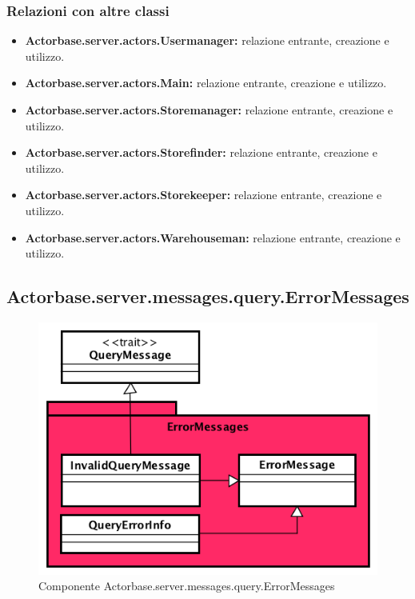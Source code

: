 \documentclass[a4paper]{article}
\begin{document}
			\subsubsection{Relazioni con altre classi}
				\begin{itemize}
					\item \textbf{Actorbase.server.actors.Usermanager:} relazione entrante, creazione e utilizzo.
					\item \textbf{Actorbase.server.actors.Main:} relazione entrante, creazione e utilizzo.
					\item \textbf{Actorbase.server.actors.Storemanager:} relazione entrante, creazione e utilizzo.
					\item \textbf{Actorbase.server.actors.Storefinder:} relazione entrante, creazione e utilizzo.
					\item \textbf{Actorbase.server.actors.Storekeeper:} relazione entrante, creazione e utilizzo.
					\item \textbf{Actorbase.server.actors.Warehouseman:} relazione entrante, creazione e utilizzo.
				\end{itemize}
				
		\subsection{Actorbase.server.messages.query.ErrorMessages}
		
			\begin{figure}[H]
				\centering
				\includegraphics[scale=0.70]{ST/Server/errorMessagesLevel}
				\caption{Componente Actorbase.server.messages.query.ErrorMessages}
			\end{figure}
			
\end{document}
